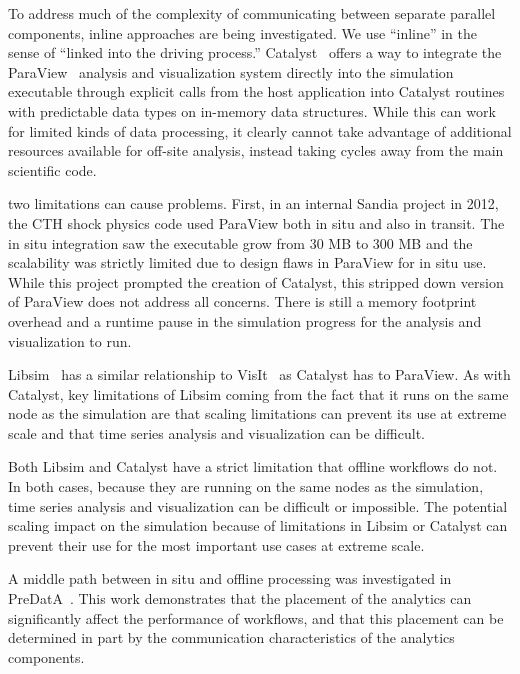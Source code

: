 To address much of the complexity of communicating between separate parallel
components, inline approaches are being investigated.
We use ``inline'' in the sense of ``linked into the driving process.''
Catalyst~\cite{karimabadi:2013:catalyst} offers a way to integrate the
ParaView~\cite{Moreland:2008:paraview} analysis and visualization system
directly into the simulation executable through explicit calls from the host
application into Catalyst routines with predictable data types on in-memory
data structures. While this can work for limited kinds of data processing,
it clearly cannot take advantage of additional resources
available for off-site analysis, instead taking cycles
away from the main scientific code.

two
limitations can cause problems. First, in an internal Sandia project in 2012,
the CTH shock physics code used ParaView both in situ and also in transit. The
in situ integration saw the executable grow from 30 MB to 300 MB and the
scalability was strictly limited due to design flaws in ParaView for in situ
use. While this project prompted the creation of Catalyst, this stripped down
version of ParaView does not address all concerns. There is still a memory
footprint overhead and a runtime pause in the simulation progress for the
analysis and visualization to run.
\fi

Libsim~\cite{whitlock:2011:libsim} has a similar relationship to
VisIt~\cite{Riedel:2007:visit} as Catalyst has to ParaView.
As with Catalyst, key limitations of Libsim coming from the
fact that it runs on the same node as the simulation are
that scaling limitations can prevent its use at extreme
scale and that time series analysis and visualization can be difficult.

Both Libsim and
Catalyst have a strict limitation that offline workflows do not. In both cases,
because they are running on the same nodes as the simulation, time series
analysis and visualization can be difficult or impossible. The potential
scaling impact on the simulation because of limitations in Libsim or Catalyst
can prevent their use for the most important use cases at extreme scale.
\fi

A middle path between in situ and offline processing was investigated in
PreDatA~\cite{zheng:2010:predata}.
This work demonstrates that the placement of the analytics can significantly
affect the performance of workflows, and that this placement can be determined
in part by the communication characteristics of the analytics components.

